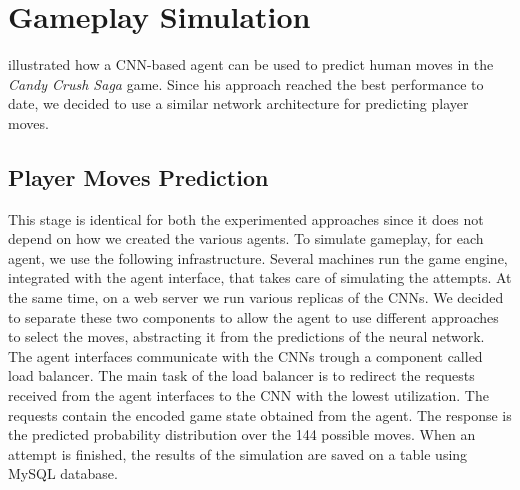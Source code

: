 \section{Gameplay Simulation}
\textcite{eisen_simulating_2017} illustrated how a \acs{CNN}-based agent can be used to predict human moves in the \textit{Candy Crush Saga} game. Since his approach reached the best performance to date, we decided to use a similar network architecture for predicting player moves. 

\subsection{Player Moves Prediction}
This stage is identical for both the experimented approaches since it does not depend on how we created the various agents. To simulate gameplay, for each agent, we use the following infrastructure. Several machines run the game engine, integrated with the agent interface, that takes care of simulating the attempts. At the same time, on a web server we run various replicas of the \acsp{CNN}. We decided to separate these two components to allow the agent to use different approaches to select the moves, abstracting it from the predictions of the neural network. The agent interfaces communicate with the \acsp{CNN} trough a component called load balancer. The main task of the load balancer is to redirect the requests received from the agent interfaces to the \acs{CNN} with the lowest utilization. The requests contain the encoded game state obtained from the agent. The response is the predicted probability distribution over the 144 possible moves. When an attempt is finished, the results of the simulation are saved on a table using MySQL database.

